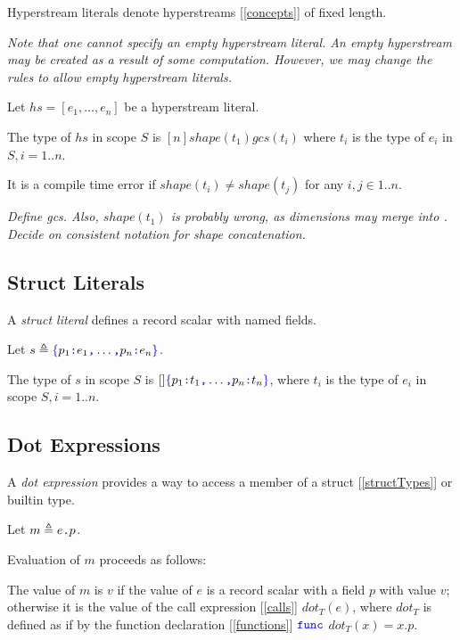 \documentclass{article}
\begin{document}
\HyperstreamLiteral

Hyperstream literals denote hyperstreams [\ref{concepts}] of fixed length. 

{\em Note that one cannot specify an empty hyperstream literal. An empty hyperstream may be created as a result of some computation. However, we may change the rules
to allow empty hyperstream literals.}

Let $hs = [e_1, \ldots, e_n]$  be a hyperstream literal. 

The type of $hs$ in scope $S$  is $[n] shape(t_1)gcs(t_i)$ where $t_i$ is the type of $e_i$ in $S, i = 1..n$.

It is a compile time error if $shape(t_i) \ne shape(t_j)$ for any $i, j \in 1..n$.

{\em Define gcs. Also, $shape(t_1)$ is probably wrong, as dimensions may merge into \QUESTIONMARK. Decide on consistent notation for shape concatenation.}


\subsection{Struct Literals}
\label{structLiterals}

A {\em struct literal} defines a record scalar with named fields.

\StructLiteral{}
\Property{}

Let $s \triangleq \texttt{\color{blue} $\{$}{}p_1\texttt{\color{blue} :}{} e_1\texttt{\color{blue} ,}{} \ldots \texttt{\color{blue} ,}{} p_n\texttt{\color{blue} :}{} e_n\texttt{\color{blue} $\}$}$.

The type of $s$ in scope $S$ is $[]\texttt{\color{blue} $\{$}{}p_1\texttt{\color{blue} :}{} t_1\texttt{\color{blue} ,}{} \ldots \texttt{\color{blue} ,}{} p_n\texttt{\color{blue} :}{} t_n\texttt{\color{blue} $\}$}$, where $t_i$ is the type of $e_i$ in scope $S, i = 1..n$.


\subsection{Dot Expressions}
\label{dotExpressions}

A {\em dot expression} provides a way to access a member of a struct [\ref{structTypes}] or builtin type.

\DotExpression{}

Let $m \triangleq e\texttt{\color{blue} .}{}p$.

Evaluation of $m$ proceeds as follows:

The value of $m$ is $v$ if the value of $e$ is a record scalar with a field $p$ with value $v$; otherwise it is the value of the call expression [\ref{calls}] $dot_T(e)$, where $dot_T$ is defined as if by the function declaration  [\ref{functions}] $\texttt{\color{blue} func}{}$ $dot_T(x) = x.p$.
\end{document}
